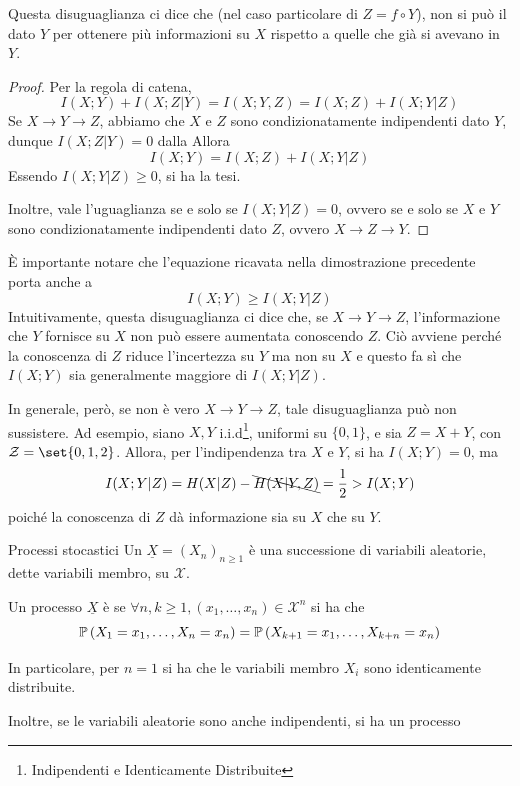 \begin{observation}{}
  Questa disuguaglianza ci dice che (nel caso particolare di \(Z = f \circ Y\)), non si può  il dato \(Y\) per ottenere più informazioni su \(X\) rispetto a quelle che già si avevano in \(Y\).
\end{observation}

\begin{proof}
  Per la regola di catena,
  \[I(X;Y)+I(X;Z|Y)=I(X;Y,Z) = I(X;Z) + I(X;Y|Z)\]
  Se \(X \to Y \to Z\), abbiamo che \(X\) e \(Z\) sono condizionatamente indipendenti dato \(Y\), dunque \(I(X;Z|Y)=0\) dalla 
  Allora
  \[I(X;Y) = I(X;Z) + I(X;Y|Z) \]
  Essendo \(I(X;Y|Z) \geq 0\), si ha la tesi.

  Inoltre, vale l'uguaglianza se e solo se \(I(X;Y|Z)=0\), ovvero se e solo se \(X\) e \(Y\) sono condizionatamente indipendenti dato \(Z\), ovvero \(X\to Z \to Y\).
\end{proof}

È importante notare che l'equazione ricavata nella dimostrazione precedente porta anche a
\[I(X;Y) \geq I(X;Y|Z)\]
Intuitivamente, questa disuguaglianza ci dice che, se \(X \to Y \to Z\), l'informazione che \(Y\) fornisce su \(X\) non può essere aumentata conoscendo \(Z\). Ciò avviene perché la conoscenza di $Z$ riduce l'incertezza su $Y$ ma non su $X$ e questo fa sì che $I(X;Y)$ sia generalmente maggiore di $I(X;Y|Z)$. 

In generale, però, se non è vero \(X \to Y \to Z\), tale disuguaglianza può non sussistere.
Ad esempio, siano \(X, Y\) i.i.d\footnote{Indipendenti e Identicamente Distribuite}, uniformi su \(\{0,1\}\), e sia \(Z = X + Y\), con \(\mathcal{Z} = \set{0,1,2}\).
Allora, per l'indipendenza tra $X$ e $Y$, si ha \(I(X;Y) = 0\), ma 
\[I(X;Y|Z) = H(X|Z) - \bcancel{H(X|Y,Z)} = \frac{1}{2} > I(X;Y)\]
poiché la conoscenza di $Z$ dà informazione sia su $X$ che su $Y$.

\begin{definition}{Processi stocastici}
  Un  \(\underline{X} = {(X_n)}_{n\geq 1}\) è una successione di variabili aleatorie, dette variabili membro, su \(\mathcal{X}\).

  Un processo \(\underline{X}\) è  se \(\forall n, k \geq 1, (x_1, \ldots, x_n) \in \mathcal{X}^n\) si ha che
  \[\Prob[X_1 = x_1, \ldots ,X_n = x_n] = \Prob[X_{k+1} = x_1, \ldots, X_{k+n} = x_n]\]

  In particolare, per \(n=1\) si ha che le variabili membro \(X_i\) sono identicamente distribuite.

  Inoltre, se le variabili aleatorie sono anche indipendenti, si ha un processo 
\end{definition}

